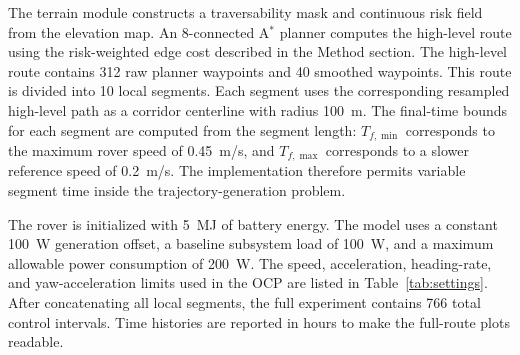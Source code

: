 \documentclass[conf]{new-aiaa}
\begin{document}
The terrain module constructs a traversability mask and continuous risk field from the elevation map. An 8-connected A$^\ast$ planner computes the high-level route using the risk-weighted edge cost described in the Method section. The high-level route contains 312 raw planner waypoints and 40 smoothed waypoints. This route is divided into 10 local segments. Each segment uses the corresponding resampled high-level path as a corridor centerline with radius \SI{100}{m}. The final-time bounds for each segment are computed from the segment length: $T_{f,\min}$ corresponds to the maximum rover speed of \SI{0.45}{m/s}, and $T_{f,\max}$ corresponds to a slower reference speed of \SI{0.2}{m/s}. The implementation therefore permits variable segment time inside the trajectory-generation problem.

The rover is initialized with \SI{5}{MJ} of battery energy. The model uses a constant \SI{100}{W} generation offset, a baseline subsystem load of \SI{100}{W}, and a maximum allowable power consumption of \SI{200}{W}. The speed, acceleration, heading-rate, and yaw-acceleration limits used in the OCP are listed in Table~\ref{tab:settings}. After concatenating all local segments, the full experiment contains 766 total control intervals. Time histories are reported in hours to make the full-route plots readable.
\end{document}
